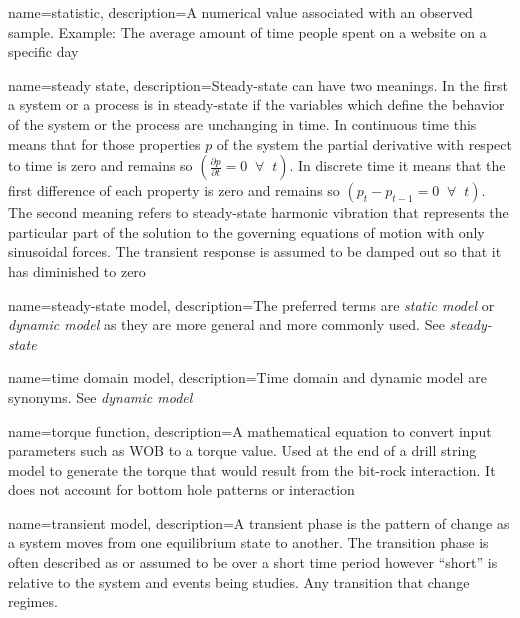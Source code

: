 {
	name=statistic,
	description={A numerical value associated with an observed sample.  Example: The average amount of time people spent on a website on a specific day}
}

\newcommand*{\systemproperty}{$p$}
\newcommand*{\continuoussteadystate}{\ensuremath{\left( \frac{\partial p}{\partial t}=0 \;\;\forall\;\; t \right)}}
\newcommand*{\discretesteadystate}{\ensuremath{\left( p_t-p_{t-1}=0 \;\;\forall\;\; t \right)}}
{
	name=steady state,
	description=Steady-state can have two meanings. In the first\comma{} a system or a process is in steady-state if the variables which define the behavior of the system or the process are unchanging in time.  In continuous time\comma{} this means that for those properties \systemproperty{} of the system\comma{} the partial derivative with respect to time is zero and remains so \continuoussteadystate{}.  In discrete time\comma{} it means that the first difference of each property is zero and remains so \discretesteadystate{}.  The second meaning refers to steady-state harmonic vibration that represents the particular part of the solution to the governing equations of motion with only sinusoidal forces.  The transient response is assumed to be damped out so that it has diminished to zero
}

{
	name=steady-state model,
	description=The preferred terms are \textit{static model} or \textit{dynamic model} as they are more general and more commonly used.  See \emph{steady-state}
}


{
	name=time domain model,
	description=Time domain and dynamic model are synonyms.  See \emph{dynamic model}
}

{
	name=torque function,
	description=A mathematical equation to convert input parameters such as WOB to a torque value.  Used at the end of a drill string model to generate the torque that would result from the bit-rock interaction.  It does not account for bottom hole patterns or interaction
}

{
	name=transient model,
	description=A transient phase is the pattern of change as a system moves from one equilibrium state to another.  The transition phase is often described as\comma{} or assumed to be\comma{} over a short time period\comma{} however\comma{} ``short'' is relative to the system and events being studies.  Any transition that change regimes.
}

